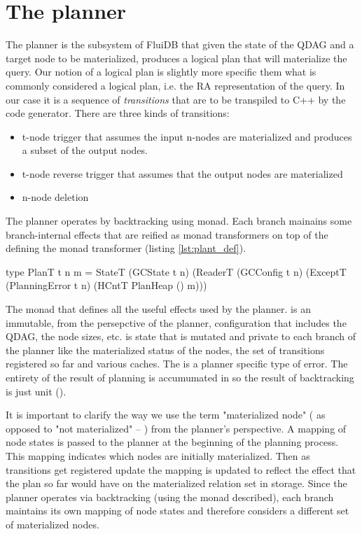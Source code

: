 \section{The planner}
\label{sec:planner}

The planner is the subsystem of FluiDB that given the state of the
QDAG and a target node to be materialized, produces a logical plan
that will materialize the query.  Our notion of a logical plan is
slightly more specific them what is commonly considered a logical
plan, i.e. the RA representation of the query. In our case it is a
sequence of \emph{transitions} that are to be transpiled to C++ by the
code generator. There are three kinds of transitions:

\begin{itemize}
\item t-node trigger that assumes the input n-nodes are materialized and
produces a subset of the output nodes.
\item t-node reverse trigger that assumes that the output nodes are materialized
\item n-node deletion
\end{itemize}

The planner operates by backtracking using  monad. Each branch
mainains some branch-internal effects that are reified as monad
transformers on top of the  defining the  monad
transformer (listing \ref{lst:plant_def}).

\begin{code}
\begin{haskellcode}
type PlanT t n m =
  StateT
    (GCState t n)
    (ReaderT (GCConfig t n)
     (ExceptT (PlanningError t n)
      (HCntT PlanHeap () m)))
\end{haskellcode}
  \caption{\label{lst:plant_def}The monad that defines all the useful
    effects used by the planner.  is an immutable,
    from the persepctive of the planner, configuration that includes
    the QDAG, the node sizes, etc.  is state that is
    mutated and private to each branch of the planner like the
    materialized status of the nodes, the set of transitions
    registered so far and various caches. The 
    is a planner specific type of error. The entirety of the result of
    planning is accumumated in  so the result of
    backtracking is just unit (\hask{()}).}
\end{code}

It is important to clarify the way we use the term "materialized node"
( as opposed to "not materialized" -- ) from the planner's
perspective. A mapping of node states is passed to the planner at the
beginning of the planning process. This mapping indicates which nodes
are initially materialized. Then as transitions get registered update
the mapping is updated to reflect the effect that the plan so far
would have on the materialized relation set in storage. Since the
planner operates via backtracking (using the  monad described),
each branch maintains its own mapping of node states and therefore
considers a different set of materialized nodes.

